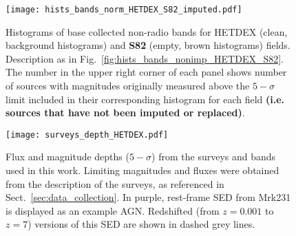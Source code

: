 \documentclass{aa}
\begin{document}
\begin{figure}
   \centering
   \texttt{[image: hists\_bands\_norm\_HETDEX\_S82\_imputed.pdf]}
   \caption{Histograms of base collected non-radio bands for HETDEX (clean, background histograms) and \textbf{S82} (empty, brown histograms) fields. Description as in Fig.~\ref{fig:hists_bands_nonimp_HETDEX_S82}. The number in the upper right corner of each panel shows number of sources with magnitudes originally measured above the $5{-}\sigma$ limit included in their corresponding histogram for each field \textbf{(i.e. sources that have not been imputed or replaced)}.}
   \label{fig:hists_bands_HETDEX_S82}
\end{figure}

\begin{table}
\setlength{\tabcolsep}{2pt}
\caption{Bands available for model training in our dataset}             %
\label{table:used_bands}      %
\centering                          %
\end{table}

\begin{figure}
   \centering
   \texttt{[image: surveys\_depth\_HETDEX.pdf]}
   \caption{Flux and magnitude depths ($5{-}\sigma$) from the surveys and bands used in this work. Limiting magnitudes and fluxes were obtained from the description of the surveys, as referenced in Sect.~\ref{sec:data_collection}. In purple, rest-frame SED from Mrk231 \citep[$z = 0.0422$,][]{2019MNRAS.489.3351B} is displayed as an example AGN. Redshifted (from $z {=} 0.001$ to $z {=} 7$) versions of this SED are shown in dashed grey lines.}
   \label{fig:surveys_depth_HETDEX}
\end{figure}
\end{document}

